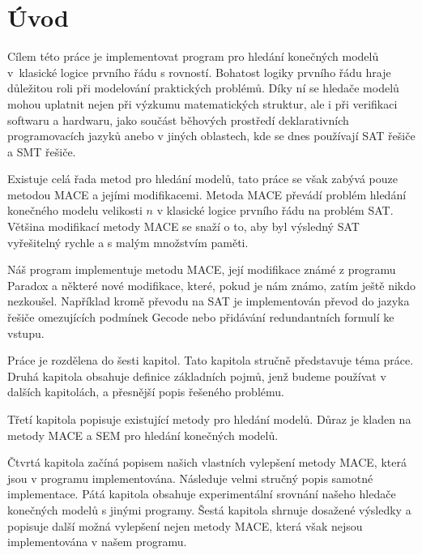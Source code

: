 \chapter{Úvod}

Cílem této práce je implementovat program pro hledání konečných
modelů v~klasické logice prvního řádu s rovností.
Bohatost logiky prvního řádu hraje důležitou roli při modelování
praktických problémů.
Díky ní se hledače modelů mohou uplatnit nejen při výzkumu
matematických struktur, ale i při verifikaci softwaru a hardwaru,
jako součást běhových prostředí deklarativních programovacích jazyků
anebo v jiných oblastech, kde se dnes používají SAT řešiče a SMT řešiče.

Existuje celá řada metod pro hledání modelů, tato práce se však
zabývá pouze metodou MACE a jejími modifikacemi.
Metoda MACE převádí problém hledání
konečného modelu velikosti $n$ v klasické logice prvního řádu
na problém SAT. Většina modifikací metody MACE se snaží o to, aby
byl výsledný SAT vyřešitelný rychle a s malým množstvím paměti.

Náš program implementuje metodu MACE, její modifikace známé
z programu Paradox a některé nové modifikace,
které, pokud je nám známo, zatím ještě nikdo nezkoušel.
Například kromě převodu na SAT je implementován
převod do jazyka řešiče omezujících podmínek Gecode
nebo přidávání redundantních formulí ke vstupu.

Práce je rozdělena do šesti kapitol. Tato kapitola
stručně představuje téma práce.
Druhá kapitola obsahuje definice základních pojmů,
jenž budeme používat v dalších kapitolách,
a přesnější popis řešeného problému.

Třetí kapitola popisuje existující metody pro hledání modelů.
Důraz je kladen na metody MACE a SEM pro hledání konečných modelů.

Čtvrtá kapitola začíná popisem našich vlastních vylepšení metody MACE,
která jsou v programu implementována.
Následuje velmi stručný popis samotné implementace.
Pátá kapitola obsahuje experimentální srovnání našeho hledače konečných modelů
s jinými programy.
Šestá kapitola shrnuje dosažené výsledky a popisuje další možná vylepšení
nejen metody MACE, která však nejsou implementována v našem programu.
